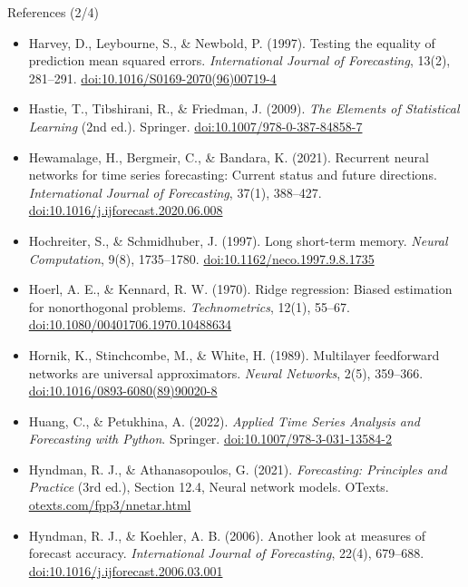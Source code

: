 \begin{frame}{References (2/4)}
\itemsize{\scriptsize}
\begin{itemize}
    \item Harvey, D., Leybourne, S., \& Newbold, P. (1997). Testing the equality of prediction mean squared errors. \textit{International Journal of Forecasting}, 13(2), 281--291. \href{https://doi.org/10.1016/S0169-2070(96)00719-4}{doi:10.1016/S0169-2070(96)00719-4}
    \item Hastie, T., Tibshirani, R., \& Friedman, J. (2009). \textit{The Elements of Statistical Learning} (2nd ed.). Springer. \href{https://doi.org/10.1007/978-0-387-84858-7}{doi:10.1007/978-0-387-84858-7}
    \item Hewamalage, H., Bergmeir, C., \& Bandara, K. (2021). Recurrent neural networks for time series forecasting: Current status and future directions. \textit{International Journal of Forecasting}, 37(1), 388--427. \href{https://doi.org/10.1016/j.ijforecast.2020.06.008}{doi:10.1016/j.ijforecast.2020.06.008}
    \item Hochreiter, S., \& Schmidhuber, J. (1997). Long short-term memory. \textit{Neural Computation}, 9(8), 1735--1780. \href{https://doi.org/10.1162/neco.1997.9.8.1735}{doi:10.1162/neco.1997.9.8.1735}
    \item Hoerl, A. E., \& Kennard, R. W. (1970). Ridge regression: Biased estimation for nonorthogonal problems. \textit{Technometrics}, 12(1), 55--67. \href{https://doi.org/10.1080/00401706.1970.10488634}{doi:10.1080/00401706.1970.10488634}
    \item Hornik, K., Stinchcombe, M., \& White, H. (1989). Multilayer feedforward networks are universal approximators. \textit{Neural Networks}, 2(5), 359--366. \href{https://doi.org/10.1016/0893-6080(89)90020-8}{doi:10.1016/0893-6080(89)90020-8}
    \item Huang, C., \& Petukhina, A. (2022). \textit{Applied Time Series Analysis and Forecasting with Python}. Springer. \href{https://doi.org/10.1007/978-3-031-13584-2}{doi:10.1007/978-3-031-13584-2}
    \item Hyndman, R. J., \& Athanasopoulos, G. (2021). \textit{Forecasting: Principles and Practice} (3rd ed.), Section 12.4, Neural network models. OTexts. \href{https://otexts.com/fpp3/nnetar.html}{otexts.com/fpp3/nnetar.html}
    \item Hyndman, R. J., \& Koehler, A. B. (2006). Another look at measures of forecast accuracy. \textit{International Journal of Forecasting}, 22(4), 679--688. \href{https://doi.org/10.1016/j.ijforecast.2006.03.001}{doi:10.1016/j.ijforecast.2006.03.001}
\end{itemize}
\end{frame}

